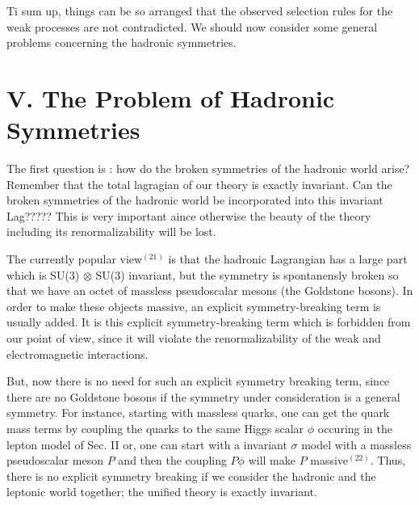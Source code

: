 Ti sum up, things can be so arranged that the observed selection rules for the weak processes are not contradicted. We should now consider some general problems concerning the hadronic symmetries. 

\section*{V. The Problem of Hadronic Symmetries}

The first question is : how do the broken symmetries of the hadronic world arise? Remember that the total lagragian of our theory is exactly invariant. Can the broken symmetries of the hadronic world be incorporated into this invariant Lag????? This is very important aince otherwise the beauty of the theory including its renormalizability will be lost.

The currently popular view$^{(21)}$ is that the hadronic Lagrangian has a large part which is SU(3) $\otimes$ SU(3) invariant, but the symmetry is spontanensly broken so that we have an octet of massless pseudoscalar mesons (the Goldstone bosons). In order to make these objects massive, an explicit symmetry-breaking term is usually added. It is this explicit symmetry-breaking term which is forbidden from our point of view, since it will violate the renormalizability of the weak and electromagnetic interactions.

But, now there is no need for such an explicit symmetry breaking term, since there are no Goldstone bosons if the symmetry under consideration is a general symmetry. For instance, starting with massless quarks, one can get the quark mass terms by coupling the quarks to the same Higgs scalar $\phi$ occuring in the lepton model of Sec. II or, one can start with a invariant $\sigma$ model with a massless pseudoscalar meson $P$ and then the coupling $P \phi$ will make $P$ massive$^{(22)}$. Thus, there is no explicit symmetry breaking if we consider the hadronic and the leptonic world together; the unified theory is exactly invariant.

